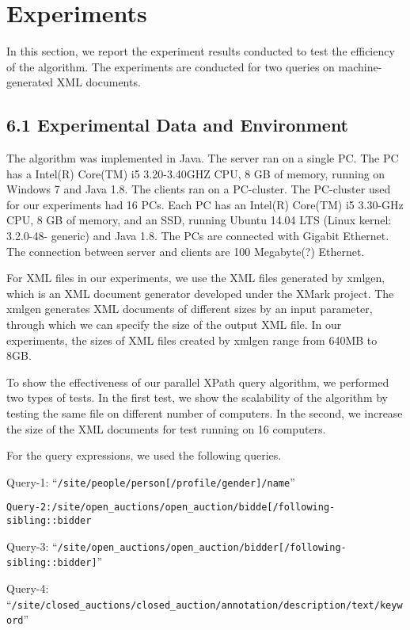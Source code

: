\section{Experiments}

In this section, we report the experiment results conducted to test the
efficiency of the algorithm. The experiments are conducted for two queries
on machine-generated XML documents.

\subsection{6.1 Experimental Data and Environment}

The algorithm was implemented in Java. The server ran on a single PC.
The PC has a Intel(R) Core(TM) i5 3.20-3.40GHZ CPU, 8 GB of memory, running on Windows 7 and Java 1.8.
The clients ran on a PC-cluster. The PC-cluster used for our experiments had 16 PCs.
Each PC has an Intel(R) Core(TM) i5 3.30-GHz CPU, 8 GB of memory, and an SSD, running Ubuntu 14.04 LTS (Linux kernel: 3.2.0-48- generic) and Java 1.8. The PCs are connected with Gigabit Ethernet.
The connection between server and clients are 100 Megabyte(?) Ethernet.

For XML files in our experiments, we use the XML files generated by xmlgen,
which is an XML document generator developed under the XMark project.
The xmlgen generates XML documents of different sizes by an input parameter,
through which we can specify the size of the output XML file. In our experiments,
the sizes of XML files created by xmlgen range from 640MB to 8GB.

To show the effectiveness of our parallel XPath query algorithm,
we performed two types of tests. In the first test, we show the scalability of
the algorithm by testing the same file on different number of computers. In the second,
we increase the size of the XML documents for test running on 16 computers.


For the query expressions, we used the following queries.

\small Query-1:  ``\verb|/site/people/person[/profile/gender]/name|''

\verb|Query-2:/site/open_auctions/open_auction/bidde[/following-sibling::bidder|


\small Query-3:  ``\verb|/site/open_auctions/open_auction/bidder[/following-sibling::bidder]|''

\small Query-4:  ``\verb|/site/closed_auctions/closed_auction/annotation/description/text/keyword|''

